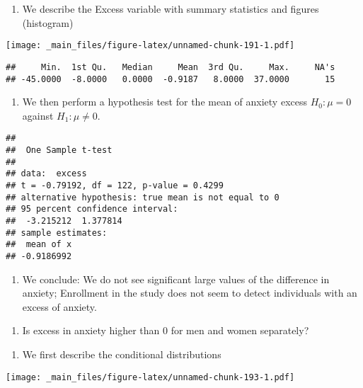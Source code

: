 \documentclass[
]{book}
\providecommand{\tightlist}{%
  \setlength{\itemsep}{0pt}\setlength{\parskip}{0pt}}
\begin{document}
\begin{enumerate}
\def\labelenumi{\alph{enumi}.}
\tightlist
\item
  We describe the Excess variable with summary statistics and figures (histogram)
\end{enumerate}

\texttt{[image: \_main\_files/figure-latex/unnamed-chunk-191-1.pdf]}

\begin{verbatim}
##     Min.  1st Qu.   Median     Mean  3rd Qu.     Max.     NA's 
## -45.0000  -8.0000   0.0000  -0.9187   8.0000  37.0000       15
\end{verbatim}

\begin{enumerate}
\def\labelenumi{\alph{enumi}.}
\setcounter{enumi}{1}
\tightlist
\item
  We then perform a hypothesis test for the mean of anxiety excess \(H_0:\mu=0\) against \(H_1:\mu \neq 0\).
\end{enumerate}

\begin{verbatim}
## 
##  One Sample t-test
## 
## data:  excess
## t = -0.79192, df = 122, p-value = 0.4299
## alternative hypothesis: true mean is not equal to 0
## 95 percent confidence interval:
##  -3.215212  1.377814
## sample estimates:
##  mean of x 
## -0.9186992
\end{verbatim}

\begin{enumerate}
\def\labelenumi{\alph{enumi}.}
\setcounter{enumi}{2}
\tightlist
\item
  We conclude: We do not see significant large values of the difference in anxiety; Enrollment in the study does not seem to detect individuals with an excess of anxiety.
\end{enumerate}

\begin{enumerate}
\def\labelenumi{\arabic{enumi}.}
\setcounter{enumi}{1}
\tightlist
\item
  Is excess in anxiety higher than \(0\) for men and women separately?
\end{enumerate}

\begin{enumerate}
\def\labelenumi{\alph{enumi}.}
\tightlist
\item
  We first describe the conditional distributions
\end{enumerate}

\texttt{[image: \_main\_files/figure-latex/unnamed-chunk-193-1.pdf]}
\end{document}
